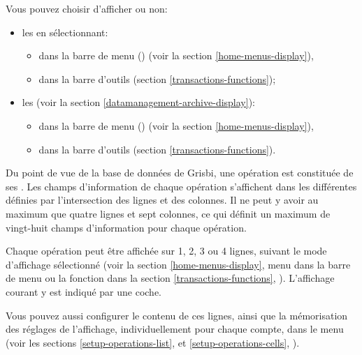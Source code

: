 Vous pouvez choisir d'afficher ou non:
\begin{itemize}
	\item les  en sélectionnant:
		\begin{itemize}
			\item dans la barre de menu  () (voir la section \vref{home-menus-display}),
			\item dans la barre d'outils  (section \vref{transactions-functions});
		\end{itemize} 
	\item les  (voir la section  \vref{datamanagement-archive-display}):
		\begin{itemize}
			\item dans la barre de menu  () (voir la section \vref{home-menus-display}),
			\item dans la barre d'outils  (section \vref{transactions-functions}).
		\end{itemize}
\end{itemize}


Du point de vue de la base de données de Grisbi, une opération est constituée de ses . Les champs d'information de chaque opération s'affichent dans les différentes  définies par l'intersection des lignes et des colonnes. Il ne peut y avoir au maximum que quatre lignes et sept colonnes, ce qui définit un maximum de vingt-huit champs d'information pour chaque opération.

Chaque opération peut être affichée sur 1, 2, 3 ou 4 lignes, suivant le mode d'affichage sélectionné (voir la section \vref{home-menus-display}, menu  dans la barre de menu ou la fonction  dans la section \vref{transactions-functions}, ). L'affichage courant y est indiqué par une coche.

Vous pouvez aussi configurer le contenu de ces lignes, ainsi que la mémorisation des réglages de l'affichage, individuellement pour chaque compte, dans le menu  (voir les sections \vref{setup-operations-list},  et \vref{setup-operations-cells}, ).

